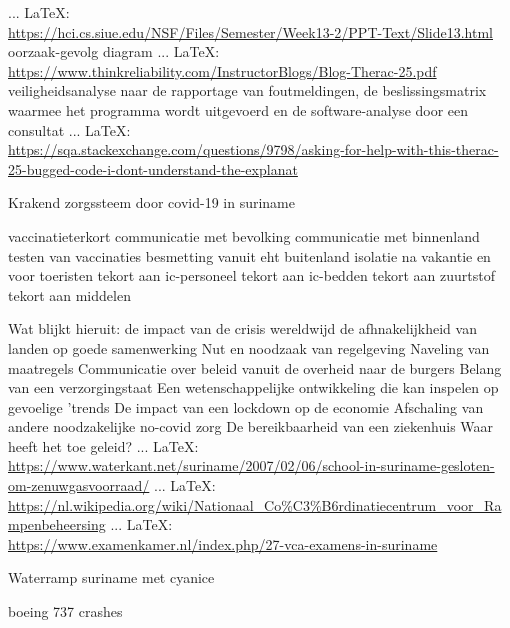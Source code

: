 \begin{thebibliography}{99}
{{{{				 ... \LaTeX:\\ \url{https://hci.cs.siue.edu/NSF/Files/Semester/Week13-2/PPT-Text/Slide13.html}
				\cite{}
				oorzaak-gevolg diagram
				 ... \LaTeX:\\ \url{https://www.thinkreliability.com/InstructorBlogs/Blog-Therac-25.pdf}
				\cite{}
				veiligheidsanalyse naar de rapportage van foutmeldingen, de beslissingsmatrix waarmee het programma wordt uitgevoerd en de software-analyse door een consultat
				 ... \LaTeX:\\ \url{https://sqa.stackexchange.com/questions/9798/asking-for-help-with-this-therac-25-bugged-code-i-dont-understand-the-explanat}
				
				
				
				
				Krakend zorgssteem door covid-19 in suriname
				
				vaccinatieterkort
				communicatie met bevolking
				communicatie met binnenland
				testen van vaccinaties
				besmetting vanuit eht buitenland
				isolatie na vakantie en voor toeristen
				tekort aan ic-personeel
				tekort aan ic-bedden
				tekort aan zuurtstof
				tekort aan middelen}
			
			Wat blijkt hieruit:
			de impact van de crisis wereldwijd
			de afhnakelijkheid van landen op goede samenwerking
			Nut en noodzaak van regelgeving
			Naveling van maatregels
			Communicatie over beleid vanuit de overheid naar de burgers
			Belang van een verzorgingstaat
			Een wetenschappelijke ontwikkeling die kan inspelen op gevoelige 'trends
			De impact van een lockdown op de economie
			Afschaling van andere noodzakelijke no-covid zorg
			De bereikbaarheid van een ziekenhuis
			Waar heeft het toe geleid?
			 ... \LaTeX:\\ \url{https://www.waterkant.net/suriname/2007/02/06/school-in-suriname-gesloten-om-zenuwgasvoorraad/}
			 ... \LaTeX:\\ \url{https://nl.wikipedia.org/wiki/Nationaal_Co%C3%B6rdinatiecentrum_voor_Rampenbeheersing}
			 ... \LaTeX:\\ \url{https://www.examenkamer.nl/index.php/27-vca-examens-in-suriname}
			
			Waterramp suriname met cyanice
			
			
			boeing 737 crashes
			
}}}
\end{thebibliography}
